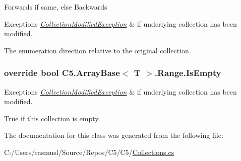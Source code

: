 {\ttfamily Forwards} if same, else {\ttfamily Backwards} 


\begin{DoxyExceptions}{Exceptions}
{\em \hyperlink{class_c5_1_1_collection_modified_exception}{Collection\+Modified\+Exception}} & if underlying collection has been modified.\\
\hline
\end{DoxyExceptions}


The enumeration direction relative to the original collection.\hypertarget{class_c5_1_1_array_base_1_1_range_afe1224ec6cd4b4a610c1a156d2a82539}{}
\subsubsection[{Is\+Empty}]{\setlength{\rightskip}{0pt plus 5cm}override bool {\bf C5.\+Array\+Base}$<$ T $>$.Range.\+Is\+Empty\hspace{0.3cm}{\ttfamily [get]}}\label{class_c5_1_1_array_base_1_1_range_afe1224ec6cd4b4a610c1a156d2a82539}





\begin{DoxyExceptions}{Exceptions}
{\em \hyperlink{class_c5_1_1_collection_modified_exception}{Collection\+Modified\+Exception}} & if underlying collection has been modified.\\
\hline
\end{DoxyExceptions}


True if this collection is empty.

The documentation for this class was generated from the following file\+:\begin{DoxyCompactItemize}
\item 
C\+:/\+Users/rasmusl/\+Source/\+Repos/\+C5/\+C5/\hyperlink{_collections_8cs}{Collections.\+cs}\end{DoxyCompactItemize}
